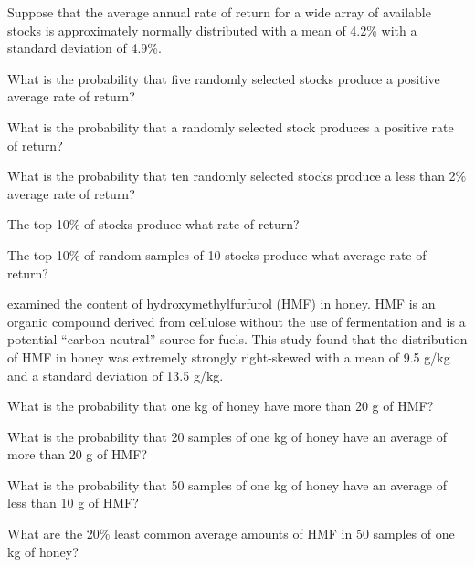 \documentclass[10pt,openany]{book}\usepackage[]{graphicx}\usepackage[]{color}
\begin{document}
\begin{exsection}
  \item \label{revex:CLTStocks} \rhw{} Suppose that the average annual rate of return for a wide array of available stocks is approximately normally distributed with a mean of 4.2\% with a standard deviation of 4.9\%.
    \begin{Enumerate}
      \item What is the probability that five randomly selected stocks produce a positive average rate of return?
      \item What is the probability that a randomly selected stock produces a positive rate of return?
      \item What is the probability that ten randomly selected stocks produce a less than 2\% average rate of return?
      \item The top 10\% of stocks produce what rate of return?
      \item The top 10\% of random samples of 10 stocks produce what average rate of return?
    \end{Enumerate}

  \item \label{revex:CLTHoney} \rhw{} \cite{Renner1970} examined the content of hydroxymethylfurfurol (HMF) in honey. HMF is an organic compound derived from cellulose without the use of fermentation and is a potential ``carbon-neutral'' source for fuels. This study found that the distribution of HMF in honey was extremely strongly right-skewed with a mean of 9.5 g/kg and a standard deviation of 13.5 g/kg.
    \begin{Enumerate}
      \item What is the probability that one kg of honey have more than 20 g of HMF?
      \item What is the probability that 20 samples of one kg of honey have an average of more than 20 g of HMF?
      \item What is the probability that 50 samples of one kg of honey have an average of less than 10 g of HMF?
      \item What are the 20\% least common average amounts of HMF in 50 samples of one kg of honey?
    \end{Enumerate}


\end{exsection}
\end{document}

